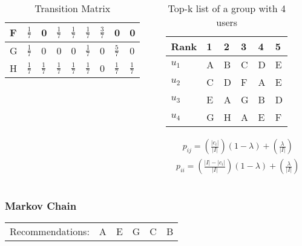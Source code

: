 \begin{frame}[t]
\begin{columns}
\begin{column}{0.6\textwidth}
\begin{table}
\begin{tabular}{|l|llllllll|}
		F & $\frac{1}{7}$ & 0 & $\frac{1}{7}$ & $\frac{1}{7}$ & $\frac{1}{7}$ & $\frac{3}{7}$ & 0 & 0 \\\hline
		G & $\frac{1}{7}$ & 0 & 0 & 0 & $\frac{1}{7}$ & 0 & $\frac{5}{7}$ & 0 \\\hline
		H & $\frac{1}{7}$ & $\frac{1}{7}$ & $\frac{1}{7}$ & $\frac{1}{7}$ & $\frac{1}{7}$ & 0 & $\frac{1}{7}$ & $\frac{1}{7}$ \\ \hline
	\end{tabular}
	\caption{Transition Matrix}
\end{table}
\normalsize
\end{column}
\begin{column}{0.5\textwidth}
	\small
	\vspace{-1cm}
	\begin{table}
		\captionsetup{font=footnotesize}
		\begin{tabular}{|l|lllll|} \hline
			Rank  & 1 & 2 & 3 & 4 & 5 \\\hline
			$u_1$ & A & B & C & D & E \\
			$u_2$ & C & D & F & A & E \\
			$u_3$ & E & A & G & B & D \\
			$u_4$ & G & H & A & E & F\\\hline
		\end{tabular}
		\caption{Top-k list of a group with 4 users}
	\end{table}

	\begin{align*}
	p_{ij} = (\frac{|c_i|}{|I|})(1-\lambda)+(\frac{\lambda}{|I|})
	\end{align*}
	\normalsize
	\begin{align*}
	p_{ii} = (\frac{|I|-|c_i|}{|I|})(1-\lambda)+(\frac{\lambda}{|I|})
	\end{align*}
\end{column}
\end{columns}
\end{frame}

\begin{frame}
\frametitle{Markov Chain}

\begin{table}
	\begin{tabular}{llllll}
		Recommendations: & A & E & G & C & B
	\end{tabular}
\end{table}
\end{frame}

%
%
%
